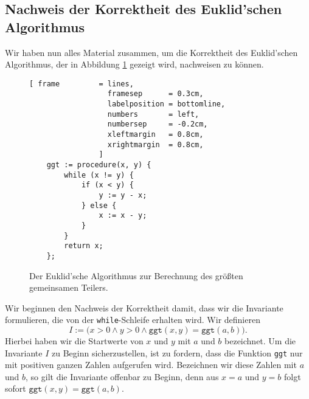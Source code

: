 \subsection{Nachweis der Korrektheit des Euklid'schen Algorithmus}
Wir haben nun alles Material zusammen, um die Korrektheit des Euklid'schen Algorithmus,
der in Abbildung
\ref{fig:ggt.c} gezeigt wird, nachweisen zu k\"onnen.

\begin{figure}[!ht]
\centering
\begin{Verbatim}[ frame         = lines, 
                  framesep      = 0.3cm, 
                  labelposition = bottomline,
                  numbers       = left,
                  numbersep     = -0.2cm,
                  xleftmargin   = 0.8cm,
                  xrightmargin  = 0.8cm,
                ]
    ggt := procedure(x, y) {
        while (x != y) {
            if (x < y) {
                y := y - x;
            } else {
                x := x - y;
            }
        }
        return x;
    };
\end{Verbatim}
\vspace*{-0.3cm}
\caption{Der Euklid'sche Algorithmus zur Berechnung des gr\"o{\ss}ten gemeinsamen Teilers.}
\label{fig:ggt.c}
\end{figure}

Wir beginnen den Nachweis der Korrektheit damit, dass wir die Invariante formulieren, die
von der \texttt{while}-Schleife erhalten wird.  Wir definieren
\[ I := \bigl(x > 0 \wedge y > 0 \wedge \texttt{ggt}(x,y) = \texttt{ggt}(a,b) \bigr).
\]
Hierbei haben wir die Startwerte von $x$ und $y$ mit $a$ und $b$ bezeichnet.
Um die Invariante $I$ zu Beginn sicherzustellen, ist zu fordern, dass die Funktion
\texttt{ggt} nur mit positiven ganzen Zahlen aufgerufen wird.  Bezeichnen wir diese Zahlen
mit $a$ und $b$, so gilt die Invariante offenbar zu Beginn, denn aus $x = a$ und $y = b$
folgt sofort $\texttt{ggt}(x,y) = \texttt{ggt}(a,b)$.

